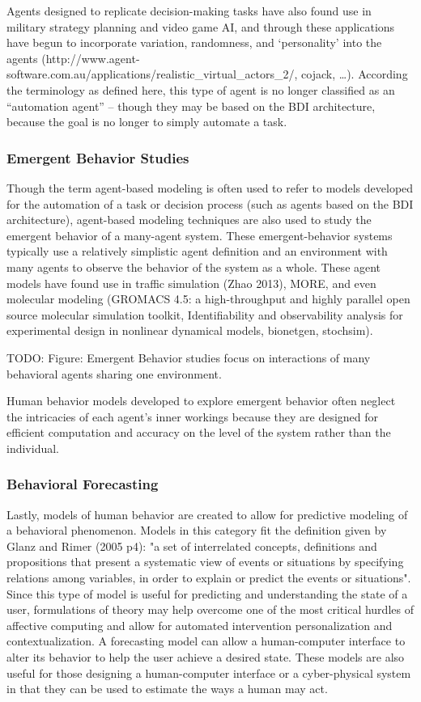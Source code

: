 Agents designed to replicate decision-making tasks have also found use in military strategy planning and video game AI, and through these applications have begun to incorporate variation, randomness, and ‘personality’ into the agents (http://www.agent-software.com.au/applications/realistic_virtual_actors_2/, cojack, …). 
According the terminology as defined here, this type of agent is no longer classified as an “automation agent” -- though they may be based on the BDI architecture, because the goal is no longer to simply automate a task.

\subsubsection{Emergent Behavior Studies}
Though the term agent-based modeling is often used to refer to models developed for the automation of a task or decision process (such as agents based on the BDI architecture), agent-based modeling techniques are also used to study the emergent behavior of a many-agent system. 
These emergent-behavior systems typically use a relatively simplistic agent definition and an environment with many agents to observe the behavior of the system as a whole. 
These agent models have found use in traffic simulation (Zhao 2013), MORE, and even molecular modeling (GROMACS 4.5: a high-throughput and highly parallel open source molecular simulation toolkit, Identifiability and observability analysis for experimental design in nonlinear dynamical models, bionetgen, stochsim).

TODO: Figure: Emergent Behavior studies focus on interactions of many behavioral agents sharing one environment.

Human behavior models developed to explore emergent behavior often neglect the intricacies of each agent’s inner workings because they are designed for efficient computation and accuracy on the level of the system rather than the individual. 

\subsubsection{Behavioral Forecasting}
Lastly, models of human behavior are created to allow for predictive modeling of a behavioral phenomenon.
Models in this category fit the definition given by Glanz and Rimer (2005 p4): "a set of interrelated concepts, definitions and propositions that present a systematic view of events or situations by specifying relations among variables, in order to explain or predict the events or situations".
Since this type of model is useful for predicting and understanding the state of a user, formulations of theory may help overcome one of the most critical hurdles of affective computing and allow for automated intervention personalization and contextualization. 
A forecasting model can allow a human-computer interface to alter its behavior to help the user achieve a desired state. 
These models are also useful for those designing a human-computer interface or a cyber-physical system in that they can be used to estimate the ways a human may act. 

